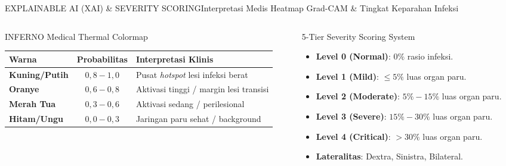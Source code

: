 \documentclass[aspectratio=169,11pt]{beamer}
\begin{document}
\begin{frame}{EXPLAINABLE AI (XAI) \& SEVERITY SCORING}{Interpretasi Medis Heatmap Grad-CAM \& Tingkat Keparahan Infeksi}
\begin{columns}[T]
  \begin{column}{0.50\textwidth}
    \begin{block}{\footnotesize INFERNO Medical Thermal Colormap}
      \centering
      \tiny
      \begin{tabular}{lcl}
        \toprule
        \textbf{Warna} & \textbf{Probabilitas} & \textbf{Interpretasi Klinis} \\
        \midrule
        \rowcolor{yellow!30} \textbf{Kuning/Putih} & $0,8 - 1,0$ & Pusat \textit{hotspot} lesi infeksi berat \\
        \rowcolor{orange!25} \textbf{Oranye} & $0,6 - 0,8$ & Aktivasi tinggi / margin lesi transisi \\
        \rowcolor{red!20} \textbf{Merah Tua} & $0,3 - 0,6$ & Aktivasi sedang / perilesional \\
        \rowcolor{purple!15} \textbf{Hitam/Ungu} & $0,0 - 0,3$ & Jaringan paru sehat / background \\
        \bottomrule
      \end{tabular}
    \end{block}
  \end{column}

  \begin{column}{0.46\textwidth}
    \begin{block}{\footnotesize 5-Tier Severity Scoring System}
      \begin{itemize}\tiny
        \item \textbf{Level 0 (Normal)}: $0\%$ rasio infeksi.
        \item \textbf{Level 1 (Mild)}: $\le 5\%$ luas organ paru.
        \item \textbf{Level 2 (Moderate)}: $5\% - 15\%$ luas organ paru.
        \item \textbf{Level 3 (Severe)}: $15\% - 30\%$ luas organ paru.
        \item \textbf{Level 4 (Critical)}: $> 30\%$ luas organ paru.
        \item \textbf{Lateralitas}: Dextra, Sinistra, Bilateral.
      \end{itemize}
    \end{block}
  \end{column}
\end{columns}
\end{frame}
\end{document}
